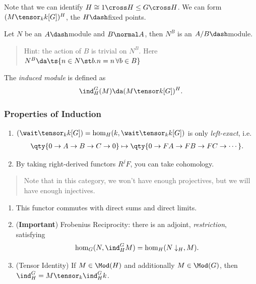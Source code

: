 Note that we can identify \(H\cong 1\cross H \leq G\cross H\). We can
form \((M\tensor_k k[G])^H\), the \(H\dash\)fixed points.

\begin{exercise}

Let \(N\) be an \(A\dash\)module and \(B\normal A\), then \(N^B\) is an
\(A/B\dash\)module.

\begin{quote}
Hint: the action of \(B\) is trivial on \(N^B\). Here
\(N^B \da \ts{n\in N \st b.n = n\, \forall b\in B}\)
\end{quote}

\end{exercise}

\begin{definition}[Induction]

The \emph{induced module} is defined as
\begin{align*}  
\ind_H^G(M) \da (M\tensor k[G])^H
.\end{align*}

\end{definition}

\hypertarget{properties-of-induction}{%
\subsubsection{Properties of Induction}\label{properties-of-induction}}

\begin{enumerate}
\def\labelenumi{\arabic{enumi}.}
\item
  \((\wait \tensor_k k[G]) = \hom_H(k, \wait \tensor_k k[G])\) is only
  \emph{left-exact}, i.e.
  \begin{align*}  
  \qty{0\to A\to B\to C\to 0}\mapsto \qty{0\to FA \to FB \to FC \to \cdots}
  .\end{align*}
\item
  By taking right-derived functors \(R^jF\), you can take cohomology.
\end{enumerate}

\begin{quote}
Note that in this category, we won't have enough projectives, but we
will have enough injectives.
\end{quote}

\begin{enumerate}
\def\labelenumi{\arabic{enumi}.}
\setcounter{enumi}{2}
\item
  This functor commutes with direct sums and direct limits.
\item
  (\textbf{Important}) Frobenius Reciprocity: there is an adjoint,
  \emph{restriction}, satisfying
  \begin{align*}  
  \hom_G(N, \ind_H^G M) = \hom_H(N\downarrow_H, M)
  .\end{align*}
\item
  (Tensor Identity) If \(M\in \Mod(H)\) and additionally
  \(M \in \Mod(G)\), then \(\ind_H^G = M \tensor_k \ind_H^G k\).
\end{enumerate}

